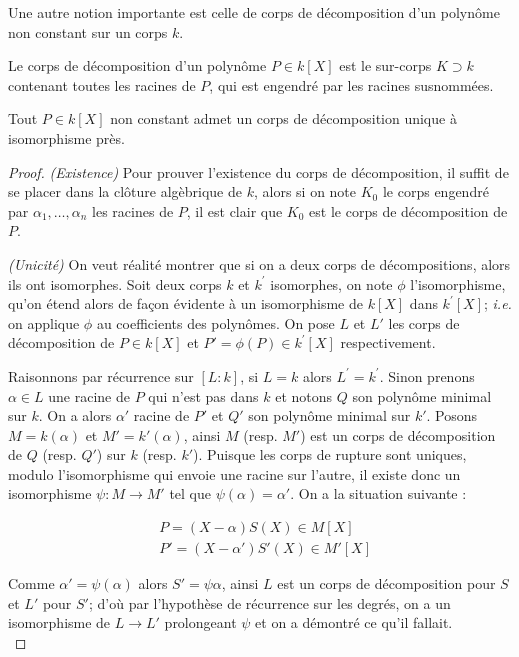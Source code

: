 \documentclass[a4paper]{article} %
\numberwithin{section}{part}
\numberwithin{equation}{section}
\begin{document}
Une autre notion importante est celle de corps de décomposition d'un polynôme 
non constant sur un corps $k$.

\begin{defn}
\label{defdec}
Le corps de décomposition d'un polynôme $P\in k[X]$ est le sur-corps $K \supset 
k$ contenant toutes les racines de $P$, qui est engendré par les racines 
susnommées.
\end{defn}

\begin{thm}
\label{cordec}
Tout $P\in k[X]$ non constant admet un corps de décomposition unique à 
isomorphisme près.
\end{thm}
\begin{proof}
\textit{(Existence)}
Pour prouver l'existence du corps de décomposition, il suffit de se placer 
dans la clôture algèbrique de $k$, alors si on note $K_0$ le corps engendré 
par $\alpha_1,\dots,\alpha_n$ les racines de $P$, il est clair que $K_0$ est 
le corps de décomposition de $P$.\par
\textit{(Unicité)}
On veut réalité montrer que si on a deux corps de décompositions, alors ils ont
isomorphes. Soit deux corps $k$ et $k^{\prime}$ isomorphes, on note $\phi$
l'isomorphisme, qu'on étend alors de façon évidente à un isomorphisme de $k[X]$ 
dans $k^{\prime}[X]$; \textit{i.e.} on applique $\phi$ au coefficients des 
polynômes. On pose  $L$ et $L'$ les corps de décomposition de $P\in k[X]$ et $P'
= \phi(P) \in k^{\prime}[X]$ respectivement.\par
Raisonnons par récurrence sur $[L:k]$, si $L = k$ alors $L^{\prime} =
k^{\prime}$. Sinon prenons $\alpha\in L$ une racine de $P$ qui n'est pas dans
$k$ et notons $Q$ son polynôme minimal sur $k$. On a alors $\alpha'$ racine de 
$P'$ et $Q'$ son polynôme minimal sur $k'$. Posons $M = k(\alpha)$ et $M' =
k'(\alpha)$, ainsi $M$ (resp. $M'$) est un corps de décomposition de $Q$ (resp.
$Q'$) sur $k$ (resp. $k'$). Puisque les corps de rupture sont uniques, modulo
l'isomorphisme qui envoie une racine sur l'autre, il existe donc un isomorphisme
$\psi : M \to M'$ tel que $\psi(\alpha) = \alpha'$. On a la situation suivante :

\begin{align*}
&P = (X - \alpha)S(X)\in M[X]\\
&P' = (X - \alpha')S'(X)\in M'[X]
\end{align*}

Comme $\alpha' = \psi(\alpha)$ alors $S'=\psi{\alpha}$, ainsi $L$ est un corps
de décomposition pour $S$ et $L'$ pour $S'$; d'où par l'hypothèse de récurrence
sur les degrés, on a un isomorphisme de $L \to L'$ prolongeant $\psi$ et on a 
démontré ce qu'il fallait.\\
\end{proof}
\end{document}

